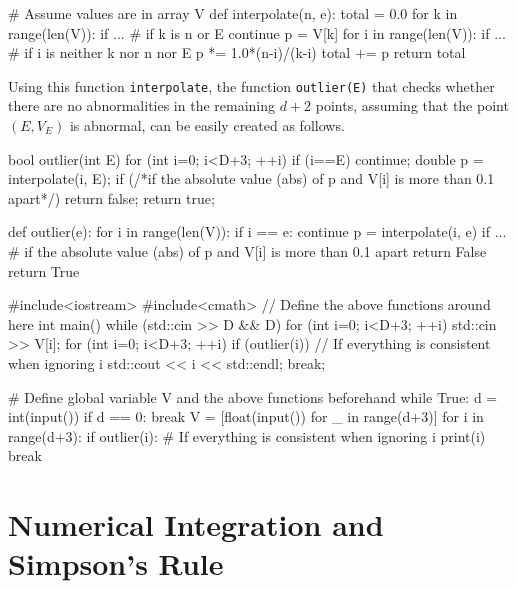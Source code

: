 \begin{versionbeta}
\begin{pybox}[emph={interpolate}]
# Assume values are in array V
def interpolate(n, e):
  total = 0.0
  for k in range(len(V)):
    if ... # if k is n or E
        continue 
    p = V[k]
    for i in range(len(V)):
        if  ... # if i is neither k nor n nor E
            p *= 1.0*(n-i)/(k-i)
    total += p
  return total
\end{pybox}

Using this function \texttt{interpolate}, the function \texttt{outlier(E)} that checks whether there are no abnormalities in the remaining $d+2$ points, assuming that the point $(E,V_E)$ is abnormal, can be easily created as follows.

\begin{cbox}[emph={outlier},emph={[2]interpolate}]
bool outlier(int E) {
    for (int i=0; i<D+3; ++i) {
        if (i==E) continue;
        double p = interpolate(i, E);
        if (/*if the absolute value (abs) of p and V[i] is more than 0.1 apart*/)
            return false;
    }
    return true;
}
\end{cbox}

\begin{pybox}[emph={outlier},emph={[2]interpolate}]
def outlier(e):
    for i in range(len(V)):
        if i == e:
            continue 
        p = interpolate(i, e)
        if ... # if the absolute value (abs) of p and V[i] is more than 0.1 apart
            return False 
    return True  
\end{pybox}

\begin{cbox}[emph={},emph={[2]outlier,interpolate}]
#include<iostream>
#include<cmath>
// Define the above functions around here
int main() {
    while (std::cin >> D && D) {
        for (int i=0; i<D+3; ++i) std::cin >> V[i];
        for (int i=0; i<D+3; ++i)
            if (outlier(i)) { // If everything is consistent when ignoring i
                std::cout << i << std::endl;
                break;
            }
    }
}
\end{cbox}

\begin{pybox}[emph={},emph={[2]outlier,interpolate}]
# Define global variable V and the above functions beforehand  
while True:
  d = int(input())
  if d == 0:
      break 
  V = [float(input()) for _ in range(d+3)]
  for i in range(d+3):
      if outlier(i): # If everything is consistent when ignoring i
          print(i)
          break  
\end{pybox}
\section{Numerical Integration and Simpson's Rule}\label{section:numerical-integration}


\end{versionbeta}
